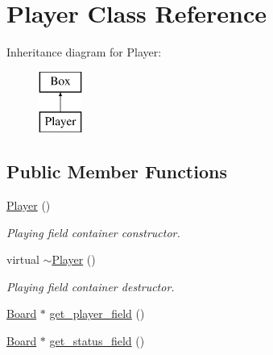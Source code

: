 \hypertarget{classPlayer}{}\section{Player Class Reference}
\label{classPlayer}
Inheritance diagram for Player\+:\begin{figure}[H]
\begin{center}
\leavevmode
\includegraphics[height=2.000000cm]{classPlayer}
\end{center}
\end{figure}
\subsection*{Public Member Functions}
\begin{DoxyCompactItemize}
\item 
\mbox{\label{classPlayer_affe0cc3cb714f6deb4e62f0c0d3f1fd8}} 
\mbox{\hyperlink{classPlayer_affe0cc3cb714f6deb4e62f0c0d3f1fd8}{Player}} ()
\begin{DoxyCompactList}\small\item\em Playing field container constructor. \end{DoxyCompactList}\item 
\mbox{\label{classPlayer_a8981c201ffb2270c0b6dbd467b627376}} 
virtual \mbox{\hyperlink{classPlayer_a8981c201ffb2270c0b6dbd467b627376}{$\sim$\+Player}} ()
\begin{DoxyCompactList}\small\item\em Playing field container destructor. \end{DoxyCompactList}\item 
\mbox{\hyperlink{classBoard}{Board}} $\ast$ \mbox{\hyperlink{classPlayer_af2e144daeef7b9582a6167ac822dcb69}{get\+\_\+player\+\_\+field}} ()
\item 
\mbox{\hyperlink{classBoard}{Board}} $\ast$ \mbox{\hyperlink{classPlayer_ae0cd4745537a2223771686c65f7acf9d}{get\+\_\+status\+\_\+field}} ()
\end{DoxyCompactItemize}
